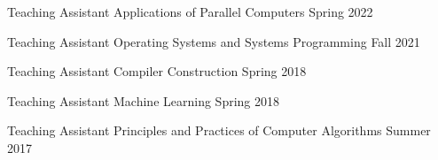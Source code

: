 



\begin{cventries}

\teachingentry
{Teaching Assistant}
{Applications of Parallel Computers } %
{Spring 2022} %
{} %
{}

\teachingentry
{Teaching Assistant}
{Operating Systems and Systems Programming } %
{Fall 2021} %
{} %
{}

\teachingentry
{Teaching Assistant}
{Compiler Construction } %
{Spring 2018} %
{} %
{}

\teachingentry
{Teaching Assistant}
{Machine Learning } %
{Spring 2018} %
{} %
{}

\teachingentry
{Teaching Assistant}
{Principles and Practices of Computer Algorithms } %
{Summer 2017} %
{} %
{}

\end{cventries}